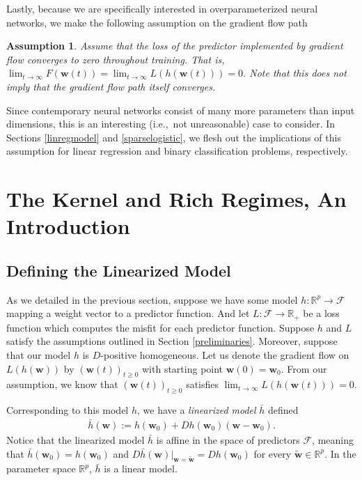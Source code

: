 \documentclass{article}
\newtheorem*{assumption}{Assumption}
\begin{document}
Lastly, because we are specifically interested in overparameterized neural networks, we make the following assumption on the gradient flow path
\begin{assumption}
Assume that the loss of the predictor implemented by gradient flow converges to zero throughout training. That is, $\lim_{t \to \infty} F(\boldsymbol{w}(t)) = \lim_{t \to \infty} L(h(\boldsymbol{w}(t))) = 0$. Note that this does not imply that the gradient flow path itself converges.
\end{assumption}
Since contemporary neural networks consist of many more parameters than input dimensions, this is an interesting (i.e.,~not unreasonable) case to consider. In Sections \ref{linregmodel} and \ref{sparselogistic}, we flesh out the implications of this assumption for linear regression and binary classification problems, respectively.


\section{The Kernel and Rich Regimes, An Introduction}\label{richkernel}

\subsection{Defining the Linearized Model}
As we detailed in the previous section, suppose we have some model $h: \mathbb{R}^p \rightarrow \mathcal{F}$ mapping a weight vector to a predictor function. And let $L: \mathcal{F} \rightarrow \mathbb{R}_+$ be a loss function which computes the misfit for each predictor function. Suppose $h$ and $L$ satisfy the assumptions outlined in Section \ref{preliminaries}. Moreover, suppose that our model $h$ is $D$-positive homogeneous. Let us denote the gradient flow on $L(h(\boldsymbol{w}))$ by $(\boldsymbol{w}(t))_{t \geq 0}$ with starting point $\boldsymbol{w}(0) = \boldsymbol{w}_0$. From our assumption, we know that $(\boldsymbol{w}(t))_{t \geq 0}$ satisfies $\lim_{t \to \infty} L(h(\boldsymbol{w}(t))) = 0$.

Corresponding to this model $h$, we have a \textit{linearized model} $\bar{h}$ defined
\begin{align}
    \bar{h}(\boldsymbol{w}) := h(\boldsymbol{w}_0) + Dh(\boldsymbol{w}_0)(\boldsymbol{w}-\boldsymbol{w}_0).\label{linearizedmodel}
\end{align}
Notice that the linearized model $\bar{h}$ is affine in the space of predictors $\mathcal{F}$, meaning that $\bar{h}(\boldsymbol{w}_0) = h(\boldsymbol{w}_0)$ and $D \bar{h}(\boldsymbol{w})|_{\boldsymbol{w} = \boldsymbol{\tilde{w}}} = D h(\boldsymbol{w}_0)$ for every $\boldsymbol{\tilde{w}} \in \mathbb{R}^p$. In the parameter space $\mathbb{R}^p$, $\bar{h}$ is a linear model.
\end{document}
